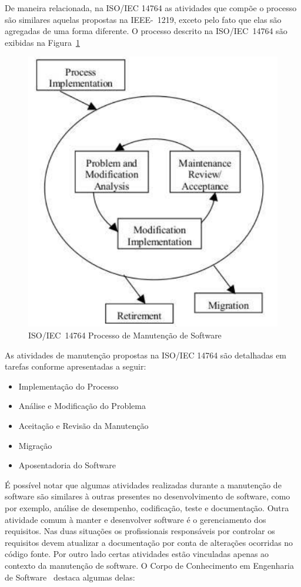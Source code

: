 De maneira relacionada, na ISO/IEC 14764 as atividades que compõe o processo são
similares aquelas propostas na IEEE-~1219, exceto pelo fato que elas são
agregadas de uma forma diferente. O processo descrito na ISO/IEC~14764 são
exibidas na Figura~\ref{fig:ieee-14764-processo-manutencao}

\begin{figure}[htpb] \centering
	\includegraphics[width=0.7\linewidth]
{chapter-manutencao-software-visao-geral/img/ieee-14764-processo-manutencao.pdf}
	\caption{ISO/IEC~14764 Processo de Manutenção de Software}
\label{fig:ieee-14764-processo-manutencao} \end{figure}

As atividades de manutenção propostas na ISO/IEC 14764 são detalhadas em tarefas
conforme apresentadas a seguir:

\begin{itemize}
   	\item Implementação do Processo
   	\item Análise e Modificação do
		Problema
	\item Aceitação e Revisão da Manutenção
   	\item Migração
   	\item Aposentadoria do Software
\end{itemize}

É possível notar que algumas atividades realizadas durante a manutenção de
software são similares à outras presentes no desenvolvimento de software, como
por exemplo, análise de desempenho, codificação, teste e documentação. Outra
atividade comum à manter e desenvolver software é o gerenciamento dos
requisitos. Nas duas situações os profissionais responsáveis por controlar os
requisitos devem atualizar a do\-cu\-men\-ta\-ção  por conta de alterações
ocorridas no código fonte. Por outro lado certas atividades estão vinculadas
apenas ao contexto da manutenção de software. O Corpo de Conhecimento em
Engenharia de Software~\cite{4425813} destaca algumas delas:

